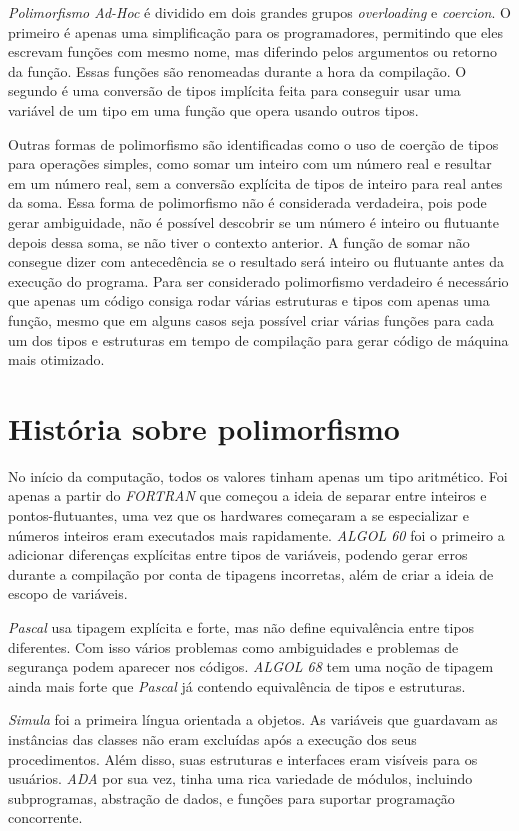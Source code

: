 \documentclass{article}
\begin{document}
\emph{Polimorfismo Ad-Hoc} é dividido em dois grandes grupos \emph{overloading} e \emph{coercion}. O primeiro é apenas uma simplificação para os programadores, permitindo que eles escrevam funções com mesmo nome, mas diferindo pelos argumentos ou retorno da função. Essas funções são renomeadas durante a hora da compilação. O segundo é uma conversão de tipos implícita feita para conseguir usar uma variável de um tipo em uma função que opera usando outros tipos.

Outras formas de polimorfismo são identificadas como o uso de coerção de tipos para operações simples, como somar um inteiro com um número real e resultar em um número real, sem a conversão explícita de tipos de inteiro para real antes da soma. Essa forma de polimorfismo não é considerada verdadeira, pois pode gerar ambiguidade, não é possível descobrir se um número é inteiro ou flutuante depois dessa soma, se não tiver o contexto anterior. A função de somar não consegue dizer com antecedência se o resultado será inteiro ou flutuante antes da execução do programa. 
Para ser considerado polimorfismo verdadeiro é necessário que apenas um código consiga rodar várias estruturas e tipos com apenas uma função, mesmo que em alguns casos seja possível criar várias funções para cada um dos tipos e estruturas em tempo de compilação para gerar código de máquina mais otimizado.

\section{História sobre polimorfismo}

\hspace{10pt} No início da computação, todos os valores tinham apenas um tipo aritmético. Foi apenas a partir do \emph{FORTRAN} que começou a ideia de separar entre inteiros e pontos-flutuantes, uma vez que os hardwares começaram a se especializar e números inteiros eram executados mais rapidamente. \emph{ALGOL 60} foi o primeiro a adicionar diferenças explícitas entre tipos de variáveis, podendo gerar erros durante a compilação por conta de tipagens incorretas, além de criar a ideia de escopo de variáveis.

\emph{Pascal} usa tipagem explícita e forte, mas não define equivalência entre tipos 
diferentes. Com isso vários problemas como ambiguidades e problemas de segurança podem aparecer nos códigos. \emph{ALGOL 68} tem uma noção de tipagem ainda mais forte que \emph{Pascal} já contendo equivalência de tipos e estruturas.

\emph{Simula} foi a primeira língua orientada a objetos. As variáveis que guardavam as instâncias das classes não eram excluídas após a execução dos seus procedimentos. Além disso, suas estruturas e interfaces eram visíveis para os usuários.
\emph{ADA} por sua vez, tinha uma rica variedade de módulos, incluindo subprogramas, abstração de dados, e funções para suportar programação concorrente.
\end{document}
